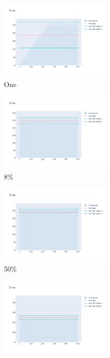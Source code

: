 \documentclass[12pt, fleqn]{report}                             %
\theoremstyle{break}                                            %
\begin{document}
      \begin{figure}[ht!]
        \centering
        \begin{subfigure}[b]{0.4\linewidth}
          \includegraphics[width=0.6\textwidth]{Images/30/dia-a.png}
          \caption{One}
        \end{subfigure}
        \begin{subfigure}[b]{0.4\linewidth}
          \includegraphics[width=0.6\textwidth]{Images/30/dia-b.png}
          \caption{8\%}
        \end{subfigure}
        \begin{subfigure}[b]{0.4\linewidth}
          \includegraphics[width=0.6\textwidth]{Images/30/dia-c.png}
          \caption{50\%}
        \end{subfigure}
        \begin{subfigure}[b]{0.4\linewidth}
          \includegraphics[width=0.6\textwidth]{Images/30/dia-d.png}

\end{subfigure}
\end{figure}
\end{document}
